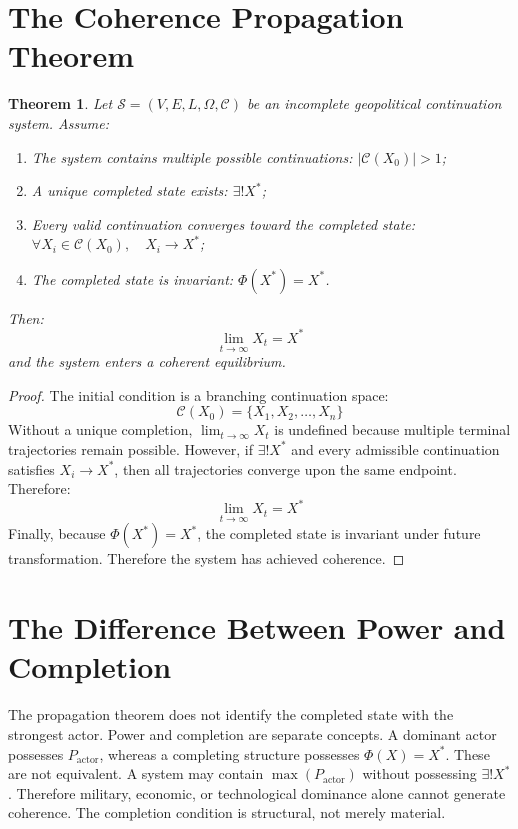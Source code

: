 \documentclass[11pt,openany]{book}
\theoremstyle{plain}
\newtheorem{theorem}{Theorem}[chapter]
\theoremstyle{definition}
\begin{document}
\section{The Coherence Propagation Theorem}

\begin{theorem}
Let \(\mathcal{S} = (V, E, L, \Omega, \mathcal{C})\) be an incomplete geopolitical continuation system. Assume:
\begin{enumerate}
\item The system contains multiple possible continuations: \(|\mathcal{C}(X_0)| > 1\);
\item A unique completed state exists: \(\exists ! X^*\);
\item Every valid continuation converges toward the completed state: \(\forall X_i \in \mathcal{C}(X_0), \quad X_i \to X^*\);
\item The completed state is invariant: \(\Phi(X^*) = X^*\).
\end{enumerate}
Then:
\[
\lim_{t \to \infty} X_t = X^*
\]
and the system enters a coherent equilibrium.
\end{theorem}

\begin{proof}
The initial condition is a branching continuation space:
\[
\mathcal{C}(X_0) = \{X_1, X_2, \ldots, X_n\}
\]
Without a unique completion, \(\lim_{t \to \infty} X_t\) is undefined because multiple terminal trajectories remain possible. However, if \(\exists ! X^*\) and every admissible continuation satisfies \(X_i \to X^*\), then all trajectories converge upon the same endpoint. Therefore:
\[
\lim_{t \to \infty} X_t = X^*
\]
Finally, because \(\Phi(X^*) = X^*\), the completed state is invariant under future transformation. Therefore the system has achieved coherence.
\end{proof}

\section{The Difference Between Power and Completion}

The propagation theorem does not identify the completed state with the strongest actor. Power and completion are separate concepts. A dominant actor possesses \(P_{\text{actor}}\), whereas a completing structure possesses \(\Phi(X) = X^*\). These are not equivalent. A system may contain \(\max(P_{\text{actor}})\) without possessing \(\exists ! X^*\). Therefore military, economic, or technological dominance alone cannot generate coherence. The completion condition is structural, not merely material.
\end{document}
